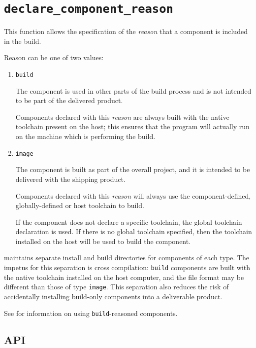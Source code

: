 \section{\texttt{declare\_component\_reason}}\label{api:reason}

This function allows the specification of the \emph{reason} that a
component is included in the build.

  Reason can be one of two values:

  \begin{enumerate}
  \item \texttt{build}

    The component is used in other parts of the build process and is
    not intended to be part of the delivered product.

    Components declared with this \emph{reason} are always built with
    the native toolchain present on the host; this ensures that the
    program will actually run on the machine which is performing the
    build.

  \item \texttt{image}

    The component is built as part of the overall project, and it is
    intended to be delivered with the shipping product.

    Components declared with this \emph{reason} will always use the
    component-defined, globally-defined or host toolchain to build.

    If the component does not declare a specific toolchain, the global
    toolchain declaration is used.  If there is no global toolchain
    specified, then the toolchain installed on the host will be used
    to build the component.

  \end{enumerate}

  \lmsbw maintains separate install and build directories for
  components of each type.  The impetus for this separation is cross
  compilation: \texttt{build} components are built with the native
  toolchain installed on the host computer, and the file format may be
  different than those of type \texttt{image}.  This separation also
  reduces the risk of accidentally installing build-only components
  into a deliverable product.

  See  for information on using
  \texttt{build}-reasoned components.

\subsection{API}

